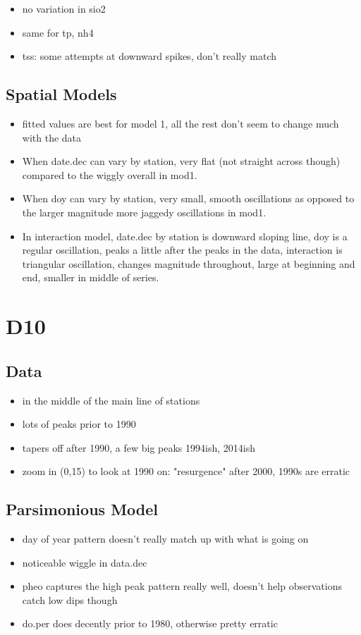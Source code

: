 \documentclass[12pt]{amsart}
\begin{document}
\begin{itemize}
\item no variation in sio2
\item same for tp, nh4
\item tss: some attempts at downward spikes, don't really match
\end{itemize}

\subsection{Spatial Models}

\begin{itemize}
\item fitted values are best for model 1, all the rest don't seem to change much with the data
\item When date.dec can vary by station, very flat (not straight across though) compared to the wiggly overall in mod1.
\item When doy can vary by station, very small, smooth oscillations as opposed to the larger magnitude more jaggedy oscillations in mod1.
\item In interaction model, date.dec by station is downward sloping line, doy is a regular oscillation, peaks a little after the peaks in the data, interaction is triangular oscillation, changes magnitude throughout, large at beginning and end, smaller in middle of series.
\end{itemize}

\section{D10}
\subsection{Data}
\begin{itemize}
\item in the middle of the main line of stations
\item lots of peaks prior to 1990
\item tapers off after 1990, a few big peaks 1994ish, 2014ish
\item zoom in (0,15) to look at 1990 on: "resurgence" after 2000, 1990s are erratic
\end{itemize}
\subsection{Parsimonious Model}
\begin{itemize}
\item day of year pattern doesn't really match up with what is going on
\item noticeable wiggle in data.dec
\item pheo captures the high peak pattern really well, doesn't help observations catch low dips though
\item do.per does decently prior to 1980, otherwise pretty erratic
\end{itemize}
\end{document}
